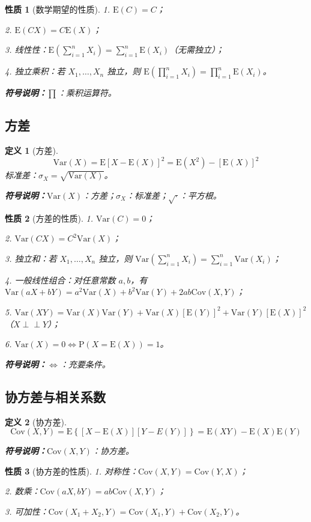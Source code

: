 \documentclass[11pt,a4paper,oneside]{article}
\theoremstyle{yhbthm}
\newtheorem{definition}{定义}[section]
\newtheorem{property}{性质}[section]
\newcommand{\Cov}{\mathrm{Cov}}
\newcommand{\E}{\mathrm{E}}
\newcommand{\D}{\mathrm{Var}}
\newcommand{\Prob}{\mathrm{P}}
\newcommand{\indep}{\perp \!\!\! \perp}
\newcommand{\symnote}[1]{\par\noindent\textbf{符号说明：}#1\par}
\begin{document}
\begin{property}[数学期望的性质]
1. $\E(C) = C$；

2. $\E(CX) = C\E(X)$；

3. 线性性：$\E\left(\sum_{i=1}^n X_i\right) = \sum_{i=1}^n \E(X_i)$（无需独立）；

4. 独立乘积：若 $X_1,\dots,X_n$ 独立，则 $\E\left(\prod_{i=1}^n X_i\right) = \prod_{i=1}^n \E(X_i)$。
\symnote{$\prod$：乘积运算符。}
\end{property}

\subsection{方差}
\begin{definition}[方差]
$$
\D(X) = \E\left[X-\E(X)\right]^2 = \E(X^2) - \left[\E(X)\right]^2
$$
标准差：$\sigma_X = \sqrt{\D(X)}$。
\symnote{$\D(X)$：方差；$\sigma_X$：标准差；$\sqrt{\cdot}$：平方根。}
\end{definition}

\begin{property}[方差的性质]
1. $\D(C) = 0$；

2. $\D(CX) = C^2 \D(X)$；

3. 独立和：若 $X_1,\dots,X_n$ 独立，则 $\D\left(\sum_{i=1}^n X_i\right) = \sum_{i=1}^n \D(X_i)$；

4. 一般线性组合：对任意常数 $a,b$，有 $\D(aX + bY) = a^2\D(X) + b^2\D(Y) + 2ab\Cov(X,Y)$；

5. $\D(XY) = \D(X)\D(Y) + \D(X)\left[\E(Y)\right]^2 + \D(Y)\left[\E(X)\right]^2$（$X \indep Y$）；

6. $\D(X) = 0 \iff \Prob(X = \E(X)) = 1$。
\symnote{$\iff$：充要条件。}
\end{property}

\subsection{协方差与相关系数}
\begin{definition}[协方差]
$$
\Cov(X,Y) = \E\left\{[X-\E(X)][Y-E(Y)]\right\} = \E(XY) - \E(X)\E(Y)
$$
\symnote{$\Cov(X,Y)$：协方差。}
\end{definition}

\begin{property}[协方差的性质]
1. 对称性：$\Cov(X, Y) = \Cov(Y, X)$；

2. 数乘：$\Cov(aX, bY) = ab\Cov(X, Y)$；

3. 可加性：$\Cov(X_1 + X_2, Y) = \Cov(X_1, Y) + \Cov(X_2, Y)$。
\end{property}
\end{document}
